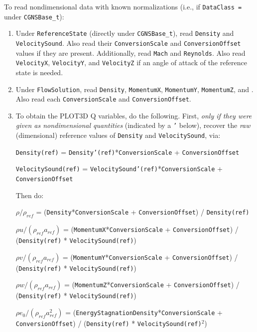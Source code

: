 \documentclass[12pt]{article}
\begin{document}
\noindent To read nondimensional data with known normalizations 
(i.e., if {\tt DataClass =} 
under {\tt CGNSBase\_t}):

\begin{enumerate}

\item Under {\tt ReferenceState} (directly under {\tt CGNSBase\_t}),
read {\tt Density} and {\tt VelocitySound}.  Also read their 
{\tt ConversionScale} and {\tt ConversionOffset} values if they are present.
Additionally, read {\tt Mach} and {\tt Reynolds}.
Also read {\tt VelocityX}, {\tt VelocityY}, and {\tt VelocityZ}
if an angle of attack of the reference state is needed.

\item Under {\tt FlowSolution}, read
{\tt Density}, {\tt MomentumX}, {\tt MomentumY},
{\tt MomentumZ}, and 
.
Also read each {\tt ConversionScale} and {\tt ConversionOffset}.

\item To obtain the
PLOT3D Q variables, do the following.  First, {\it only if they were
given as nondimensional quantities} (indicated by a {\tt '} below), 
recover the {\it raw} (dimensional) reference
values of {\tt Density} and {\tt VelocitySound}, via:

{\tt Density(ref)} = {\tt Density'(ref)}*{\tt ConversionScale} + {\tt ConversionOffset}

{\tt VelocitySound(ref)} = {\tt VelocitySound'(ref)}*{\tt ConversionScale} + {\tt ConversionOffset}

\noindent Then do:

$\rho/\rho_{ref}$ = ({\tt Density}*{\tt ConversionScale} + {\tt ConversionOffset}) 
/ {\tt Density(ref)}

$\rho u/(\rho_{ref}a_{ref})$ = ({\tt MomentumX}*{\tt ConversionScale} + {\tt ConversionOffset})  
/ ({\tt Density(ref)} * {\tt VelocitySound(ref)})

$\rho v/(\rho_{ref}a_{ref})$ = ({\tt MomentumY}*{\tt ConversionScale} + {\tt ConversionOffset}) 
/ ({\tt Density(ref)} * {\tt VelocitySound(ref)})

$\rho w/(\rho_{ref}a_{ref})$ = ({\tt MomentumZ}*{\tt ConversionScale} + {\tt ConversionOffset}) 
/ ({\tt Density(ref)} * {\tt VelocitySound(ref)})

$\rho e_0/(\rho_{ref}a_{ref}^2)$ = ({\tt EnergyStagnationDensity}*{\tt ConversionScale} + 
{\tt ConversionOffset}) /
({\tt Density(ref)} * {\tt VelocitySound(ref)}$^2$)

\end{enumerate}
\end{document}
